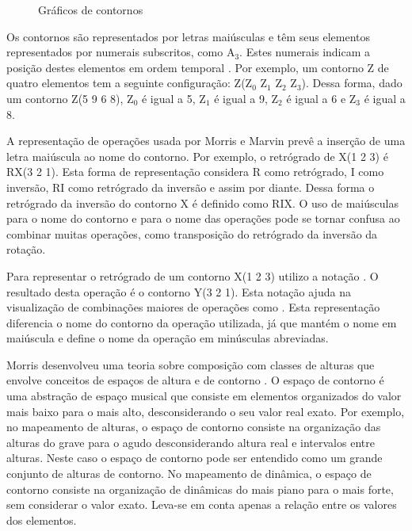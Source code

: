 \begin{figure}
  \centering
  \subfloat[contorno P(0 3 1 2)]{
    \texttt{[image: c-0312]}
    \label{fig:cseg-0312}
  }
  \subfloat[contorno Q(0 2 1 3)]{
    \texttt{[image: c-0213]}
    \label{fig:cseg-0213}
  }
  \subfloat[contorno R(2 0 3 1)]{
    \texttt{[image: c-2031]}
    \label{fig:cseg-2031}
  }
  \caption{Gráficos de contornos}
  \label{fig:graficos-cseg}
\end{figure}

Os contornos são representados por letras maiúsculas e têm seus
elementos representados por numerais subscritos, como A$_3$. Estes
numerais indicam a posição destes elementos em ordem temporal
\cite{marvin.ea87:relating}. Por exemplo, um contorno Z de quatro
elementos tem a seguinte configuração: Z(Z$_0$ Z$_1$ Z$_2$
Z$_3$). Dessa forma, dado um contorno Z(5 9 6 8), Z$_0$ é igual a 5,
Z$_1$ é igual a 9, Z$_2$ é igual a 6 e Z$_3$ é igual a 8.

A representação de operações usada por Morris e Marvin prevê a
inserção de uma letra maiúscula ao nome do contorno. Por exemplo, o
retrógrado de X(1 2 3) é RX(3 2 1). Esta forma de representação
considera R como retrógrado, I como inversão, RI como retrógrado da
inversão e assim por diante. Dessa forma o retrógrado da inversão do
contorno X é definido como RIX. O uso de maiúsculas para o nome do
contorno e para o nome das operações pode se tornar confusa ao
combinar muitas operações, como transposição do retrógrado da inversão
da rotação.


Para representar o retrógrado de um contorno X(1 2 3) utilizo a
notação . O resultado desta operação é o contorno
Y(3 2 1). Esta notação ajuda na visualização de combinações maiores de
operações como . Esta
representação diferencia o nome do contorno da operação utilizada, já
que mantém o nome em maiúscula e define o nome da operação em
minúsculas abreviadas.

Morris desenvolveu uma teoria sobre composição com classes de alturas
que envolve conceitos de espaços de altura e de contorno
\cite[p. 3]{morris87:composition}. O espaço de contorno é uma
abstração de espaço musical que consiste em elementos organizados do
valor mais baixo para o mais alto, desconsiderando o seu valor real
exato. Por exemplo, no mapeamento de alturas, o espaço de contorno
consiste na organização das alturas do grave para o agudo
desconsiderando altura real e intervalos entre alturas. Neste caso o
espaço de contorno pode ser entendido como um grande conjunto de
alturas de contorno. No mapeamento de dinâmica, o espaço de contorno
consiste na organização de dinâmicas do mais piano para o mais forte,
sem considerar o valor exato. Leva-se em conta apenas a relação entre
os valores dos elementos.

